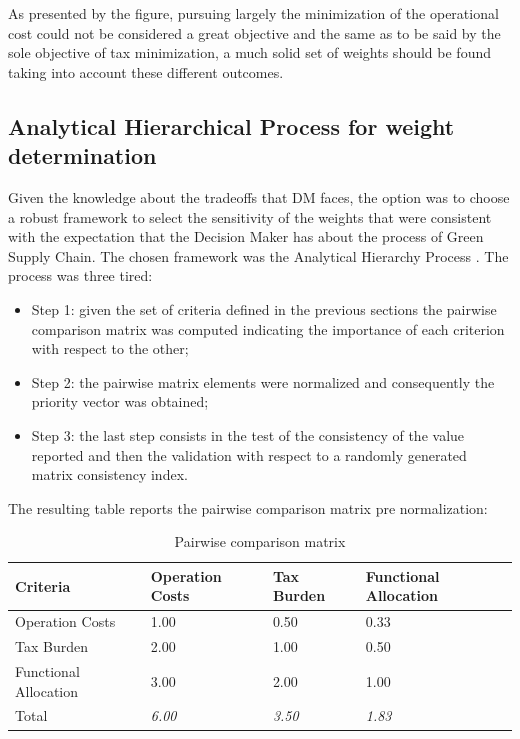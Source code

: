\begin{doublespace}
As presented by the figure, pursuing largely the minimization of the operational cost could not be considered a great objective and the same as to be said by the sole objective of tax minimization, a much solid set of weights should be found taking into account these different outcomes.

\subsection{Analytical Hierarchical Process for weight determination}
Given the knowledge about the tradeoffs that DM faces, the option was to choose a robust framework to select the sensitivity of the weights that were consistent with the expectation that the Decision Maker has about the process of Green Supply Chain. The chosen framework was the Analytical Hierarchy Process \cite{Saaty1980}. The process was three tired:

\begin{itemize}
    \item Step 1: given the set of criteria defined in the previous sections the pairwise comparison matrix was computed indicating the importance of each criterion with respect to the other;
    \item Step 2: the pairwise matrix elements were normalized and consequently the priority vector was obtained;
    \item Step 3: the last step consists in the test of the consistency of the value reported and then the validation with respect to a randomly generated matrix consistency index.
\end{itemize}

The resulting table reports the pairwise comparison matrix pre normalization:

\begin{table}[ht]
\centering
\begin{tabular}{@{}llll@{}}
\toprule
\textbf{Criteria}     & Operation Costs & Tax Burden    & Functional Allocation \\ \midrule
Operation Costs       & 1.00            & 0.50          & 0.33                  \\
Tax Burden            & 2.00            & 1.00          & 0.50                  \\
Functional Allocation & 3.00            & 2.00          & 1.00                  \\
Total                 & \textit{6.00}   & \textit{3.50} & \textit{1.83}         \\ \bottomrule
\end{tabular}
\caption{Pairwise comparison matrix}
\end{table}


\end{doublespace}
